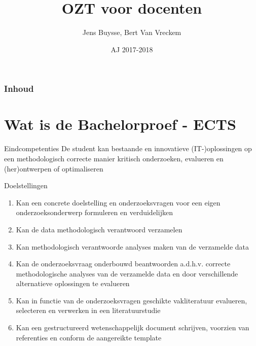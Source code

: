 \documentclass{beamer}
\title[Intro]{OZT voor docenten}
\author{Jens Buysse, Bert {Van Vreckem}}
\date{AJ 2017-2018}
\begin{document}


\HoGentLogo

\titleframe


\begin{frame}
  \frametitle{Inhoud}

  \tableofcontents
\end{frame}

\section{Wat is de Bachelorproef - ECTS}

\begin{frame}{}
	
	\begin{alertblock}{Eindcompetenties}
			De student kan bestaande en innovatieve (IT-)oplossingen op een methodologisch correcte manier kritisch onderzoeken, evalueren en (her)ontwerpen of optimaliseren
	\end{alertblock}

\end{frame}

\begin{frame}{Doelstellingen}
	\begin{enumerate}
		\item Kan een \textcolor{HoGentAccent1}{concrete doelstelling} en onderzoeksvragen voor een eigen onderzoeksonderwerp formuleren en verduidelijken 
		\item Kan de data \textcolor{HoGentAccent1}{methodologisch verantwoord} verzamelen 
		\item Kan \textcolor{HoGentAccent1}{methodologisch verantwoorde} analyses maken van de verzamelde data 
		\item Kan de onderzoeksvraag onderbouwd beantwoorden a.d.h.v. correcte methodologische analyses van de verzamelde data en door \textcolor{HoGentAccent1}{verschillende alternatieve oplossingen} te evalueren 
		\item Kan in functie van de onderzoeksvragen \textcolor{HoGentAccent1}{geschikte vakliteratuur} evalueren, selecteren en verwerken in een literatuurstudie 
		\item Kan een \textcolor{HoGentAccent1}{gestructureerd wetenschappelijk document} schrijven, voorzien van \textcolor{HoGentAccent1}{referenties} en conform de aangereikte template
	\end{enumerate}
\end{frame}
\end{document}
